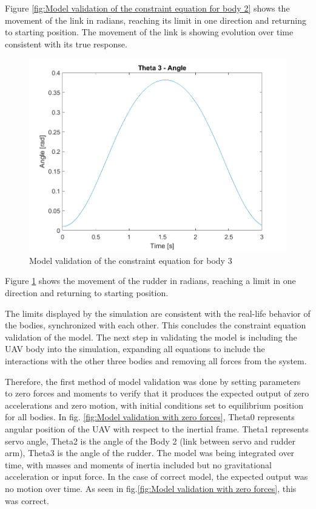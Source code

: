 Figure \ref{fig:Model validation of the constraint equation for body 2} shows the movement of the link in radians, reaching its limit in one direction and returning to starting position. The movement of the link is showing evolution over time consistent with its true response. 

\begin{figure}[H]
  \centering
  \includegraphics[scale=0.8]{graphics/Integration/theta3.png}
  \caption{Model validation of the constraint equation for body 3}
  \label{fig:Model validation of the constraint equation for body 3}
\end{figure}

Figure \ref{fig:Model validation of the constraint equation for body 3} shows the movement of the rudder in radians, reaching a limit in one direction and returning to starting position.   

The limits displayed by the simulation are consistent with the real-life behavior of the bodies, synchronized with each other. This concludes the constraint equation validation of the model. The next step in validating the model is including the UAV body into the simulation, expanding all equations to include the interactions with the other three bodies and removing all forces from the system.

Therefore, the first method of model validation was done by setting parameters to zero forces and moments to verify that it produces the expected output of zero accelerations and zero motion, with initial conditions set to equilibrium position for all bodies. 
In fig. \ref{fig:Model validation with zero forces}, Theta0 represents angular position of the UAV with respect to the inertial frame. Theta1 represents servo angle, Theta2 is the angle of the Body 2 (link between servo and rudder arm), Theta3 is the angle of the rudder. 
The model was being integrated over time, with masses and moments of inertia included but no gravitational acceleration or input force. In the case of correct model, the expected output was no motion over time. As seen in  fig.\ref{fig:Model validation with zero forces}, this was correct. 



